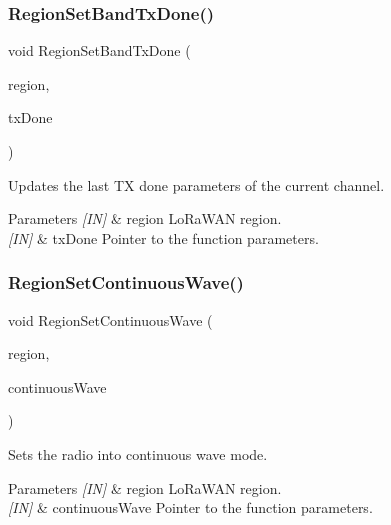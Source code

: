 \subsubsection{\texorpdfstring{Region\+Set\+Band\+Tx\+Done()}{RegionSetBandTxDone()}}
{\footnotesize\ttfamily void Region\+Set\+Band\+Tx\+Done (\begin{DoxyParamCaption}\item[{\hyperlink{group__LORAMAC_ga80c48efda9ae02e14b58160d34a798dd}{Lo\+Ra\+Mac\+Region\+\_\+t}}]{region,  }\item[{\hyperlink{group__REGION_gad0524aa0673c0814a71e7a4f9cade3fc}{Set\+Band\+Tx\+Done\+Params\+\_\+t} $\ast$}]{tx\+Done }\end{DoxyParamCaption})}



Updates the last TX done parameters of the current channel. 


\begin{DoxyParams}{Parameters}
{\em \mbox{[}\+I\+N\mbox{]}} & region Lo\+Ra\+W\+AN region.\\
\hline
{\em \mbox{[}\+I\+N\mbox{]}} & tx\+Done Pointer to the function parameters. \\
\hline
\end{DoxyParams}
\mbox{\label{group__REGION_ga22327f217ed10d84c89b6785143be5b8}} 
\subsubsection{\texorpdfstring{Region\+Set\+Continuous\+Wave()}{RegionSetContinuousWave()}}
{\footnotesize\ttfamily void Region\+Set\+Continuous\+Wave (\begin{DoxyParamCaption}\item[{\hyperlink{group__LORAMAC_ga80c48efda9ae02e14b58160d34a798dd}{Lo\+Ra\+Mac\+Region\+\_\+t}}]{region,  }\item[{\hyperlink{group__REGION_gaf39bb5ba06921139c6d17f88a8d518cd}{Continuous\+Wave\+Params\+\_\+t} $\ast$}]{continuous\+Wave }\end{DoxyParamCaption})}



Sets the radio into continuous wave mode. 


\begin{DoxyParams}{Parameters}
{\em \mbox{[}\+I\+N\mbox{]}} & region Lo\+Ra\+W\+AN region.\\
\hline
{\em \mbox{[}\+I\+N\mbox{]}} & continuous\+Wave Pointer to the function parameters. \\
\hline
\end{DoxyParams}
\mbox{\label{group__REGION_ga9a4b01301e0f6f6880dc6a651c062ad0}} 
